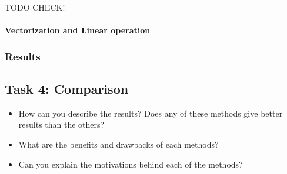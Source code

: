 \documentclass[paper=a4, fontsize=11pt]{scrartcl} %
\numberwithin{equation}{section} %
\numberwithin{figure}{section} %
\numberwithin{table}{section} %
\begin{document}
TODO CHECK!




\paragraph{Vectorization and Linear operation}

\subsubsection{Results}


\subsection{Task 4: Comparison}

\begin{itemize}
	\item How can you describe the results? Does any of these methods give better results than the others? 
	\item What are the benefits and drawbacks of each methods?
	\item Can you explain the motivations behind each of the methods? 
\end{itemize}



 

\end{document}
